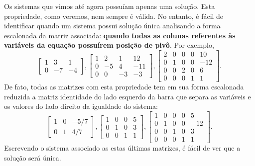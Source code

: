Os sistemas que vimos até agora possuíam apenas uma solução. Esta propriedade, como veremos, nem sempre é válida. No entanto, é fácil de identificar quando um sistema possui solução única analisando a forma escalonada da matriz associada: \textbf{quando todas as colunas referentes às variáveis da equação possuírem posição de pivô}. Por exemplo,
\begin{equation}
\left[
 \begin{array}{cc|c}
  1 & 3 & 1 \\
  0 & -7 & -4
 \end{array}
\right],
\left[
  \begin{array}{ccc|c}
    1 &  2 &  1 &  12 \\
    0 & -5 &  4 & -11 \\
    0 &  0 & -3 & -3
  \end{array}
\right],
 \left[
  \begin{array}{cccc|c}
    2 &  0 &  0 & 0 & 10 \\
    0 &  1 &  0 & 0 & -12 \\
    0 &  0 &  2 & 0 & 6 \\
    0 &  0 &  0 & 1 & 1
  \end{array}
\right].
\end{equation} De fato, todas as matrizes com esta propriedade tem em sua forma escalonada reduzida a matriz identidade do lado esquerdo da barra que separa as variáveis e os valores do lado direito da igualdade do sistema:
\begin{equation}
\left[
 \begin{array}{cc|c}
  1 & 0 & -5/7 \\
  0 & 1 &  4/7
 \end{array}
\right],
\left[
  \begin{array}{ccc|c}
    1 &  0 &  0   &  5 \\
    0 &  1 &  0   &  3 \\
    0 &  0 &  1   &  1
  \end{array}
\right],
 \left[
  \begin{array}{cccc|c}
    1 &  0 &  0 & 0 & 5 \\
    0 &  1 &  0 & 0 & -12 \\
    0 &  0 &  1 & 0 & 3 \\
    0 &  0 &  0 & 1 & 1
  \end{array}
\right].
\end{equation} Escrevendo o sistema associado as estas últimas matrizes, é fácil de ver que a solução será única.


